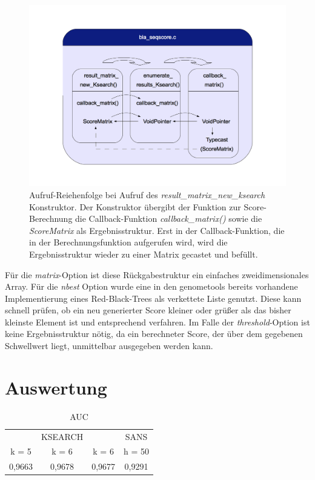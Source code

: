 \documentclass{article}
\begin{document}
\begin{center}
  \begin{figure}
    \includegraphics[width = \linewidth]{img/dia3}
    \caption{Aufruf-Reiehenfolge bei Aufruf des \emph{result\_matrix\_new\_ksearch} Konstruktor. Der Konstruktor übergibt der Funktion zur Score-Berechnung
      die Callback-Funktion \emph{callback\_matrix()} sowie die \emph{ScoreMatrix} als Ergebnisstruktur. Erst in der Callback-Funktion, die in der 
      Berechnungsfunktion aufgerufen wird, wird die Ergebnisstruktur wieder zu einer Matrix gecastet und befüllt.}
    \label{kscallback}
  \end{figure}
\end{center}

Für die \emph{matrix}-Option ist diese Rückgabestruktur ein einfaches zweidimensionales Array. Für die \emph{nbest} Option wurde eine in den genometools
bereits vorhandene Implementierung eines Red-Black-Trees als verkettete Liste genutzt. Diese kann schnell prüfen, ob ein neu generierter Score kleiner oder
grüßer als das bisher kleinste Element ist und entsprechend verfahren. Im Falle der \emph{threshold}-Option ist keine Ergebnisstruktur nötig,
da ein berechneter Score, der über dem gegebenen Schwellwert liegt, unmittelbar ausgegeben werden kann.

\section{Auswertung}


  \begin{table}[h]
    \caption{AUC}
    \begin{center}
    \begin{tabular}{cccc}
      \hline
      &KSEARCH& &SANS\\
      k = 5 & k = 6 & k = 6 & h = 50 \\
      \hline
      0,9663 & 0,9678 & 0,9677 & 0,9291 \\
      \hline
    \end{tabular}\\
    \end{center}
  \end{table}
\end{document}
